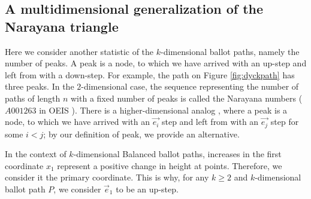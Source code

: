 \documentclass[12pt,notitlepage]{amsart}
\numberwithin{equation}{section}
\theoremstyle{thmstyleone}%
\theoremstyle{thmstyletwo}%
\theoremstyle{thmstylethree}%
\numberwithin{theorem}{section}
\numberwithin{equation}{section}
\begin{document}
\subsection{A multidimensional generalization of the Narayana triangle}\label{sec:Narayana}
Here we consider another statistic of the $k$-dimensional ballot paths, namely the number of peaks. A peak is a node, to which we have arrived with an up-step and left from with a down-step. For example, the path on Figure \ref{fig:dyckpath} has three peaks. In the $2$-dimensional case, the sequence representing the number of paths of length $n$ with a fixed number of peaks is called the Narayana numbers ($A001263$ in OEIS \cite{oeis}). There is a higher-dimensional analog \cite{multidimnarayana}, where a peak is a node, to which we have arrived with an $\vec{e_i}$  step and left from with an $\vec{e_j}$ step for some $i<j$; by our definition of peak, we provide an alternative.

In the context of $k$-dimensional Balanced ballot paths, increases in the first coordinate \( x_1 \) represent a positive change in height at points. Therefore, we consider it the primary coordinate. This is why, for any $k \geq 2$ and $k$-dimensional ballot path $P$, we consider $\vec{e}_1$ to be an up-step.
\end{document}
